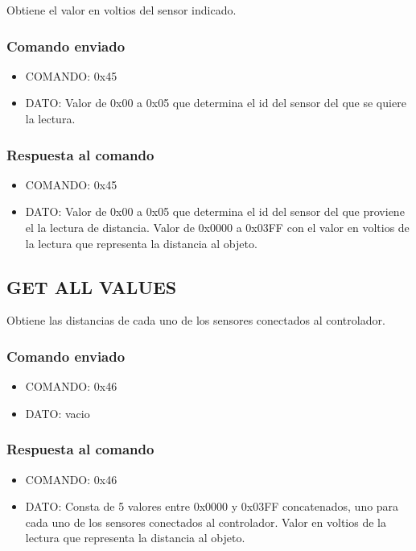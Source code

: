 \documentclass[a4paper,10pt]{article}
\begin{document}
Obtiene el valor en voltios del sensor indicado.

\subsubsection*{Comando enviado}

\begin{itemize}
	\item{COMANDO:} 0x45
	\item{DATO:} Valor de 0x00 a 0x05 que determina el id del sensor del que se quiere la lectura.
\end{itemize}

\subsubsection*{Respuesta al comando}

\begin{itemize}
	\item{COMANDO:} 0x45
	\item{DATO:} Valor de 0x00 a 0x05 que determina el id del sensor del que proviene el la lectura de distancia.
	Valor de 0x0000 a 0x03FF con el valor en voltios de la lectura que representa la distancia al objeto.
\end{itemize}

\subsection{GET ALL VALUES}
\label{get_all_values_us}

Obtiene las distancias de cada uno de los sensores conectados al controlador.

\subsubsection*{Comando enviado}

\begin{itemize}
	\item{COMANDO:} 0x46
	\item{DATO:} vacio
\end{itemize}

\subsubsection*{Respuesta al comando}

\begin{itemize}
	\item{COMANDO:} 0x46
	\item{DATO:} Consta de 5 valores entre 0x0000 y 0x03FF concatenados, uno para cada uno de los sensores conectados al controlador.
	Valor en voltios de la lectura que representa la distancia al objeto.
\end{itemize}
\end{document}
